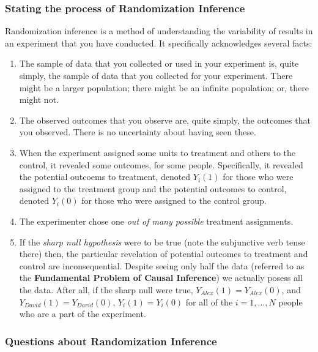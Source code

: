 \documentclass[
]{article}
\providecommand{\tightlist}{%
  \setlength{\itemsep}{0pt}\setlength{\parskip}{0pt}}
\begin{document}
\hypertarget{stating-the-process-of-randomization-inference}{%
\subsubsection{Stating the process of Randomization Inference}\label{stating-the-process-of-randomization-inference}}

Randomization inference is a method of understanding the variability of results in an experiment that you have conducted. It specifically acknowledges several facts:

\begin{enumerate}
\def\labelenumi{\arabic{enumi}.}
\tightlist
\item
  The sample of data that you collected or used in your experiment is, quite simply, the sample of data that you collected for your experiment. There might be a larger population; there might be an infinite population; or, there might not.
\item
  The observed outcomes that you observe are, quite simply, the outcomes that you observed. There is no uncertainty about having seen these.
\item
  When the experiment assigned some units to treatment and others to the control, it revealed some outcomes, for some people. Specifically, it revealed the potential outcoems to treatment, denoted \(Y_{i}(1)\) for those who were assigned to the treatment group and the potential outcomes to control, denoted \(Y_{i}(0)\) for those who were assigned to the control group.
\item
  The experimenter chose one \emph{out of many possible} treatment assignments.
\item
  If the \emph{sharp null hypothesis} were to be true (note the subjunctive verb tense there) then, the particular revelation of potential outcomes to treatment and control are inconsequential. Despite seeing only half the data (referred to as the \textbf{Fundamental Problem of Causal Inference}) we actually posess all the data. After all, if the sharp null were true, \(Y_{Alex}(1) = Y_{Alex}(0)\), and \(Y_{David}(1) = Y_{David}(0)\), \(Y_{i}(1) = Y_{i}(0)\) for all of the \(i = {1, \dots, N}\) people who are a part of the experiment.
\end{enumerate}

\hypertarget{questions-about-randomization-inference}{%
\subsubsection{Questions about Randomization Inference}\label{questions-about-randomization-inference}}
\end{document}
